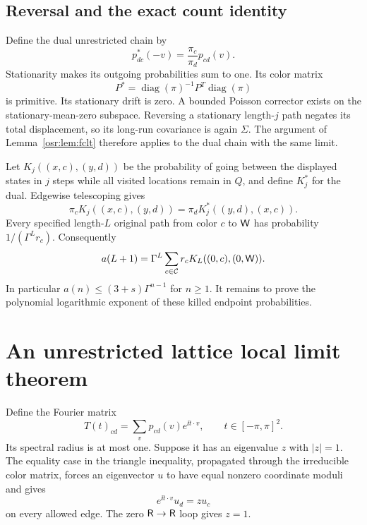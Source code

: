 \documentclass[11pt,letterpaper]{article}
\newcommand{\diag}{\operatorname{diag}}\newcommand{\rad}{\operatorname{rad}}
\newcommand{\G}{\Gamma}\newcommand{\s}{\sqrt{17}}
\numberwithin{equation}{section}
\begin{document}
\subsection{Reversal and the exact count identity}
Define the dual unrestricted chain by
\begin{equation}\label{osr:eq:dual}
 p^*_{dc}(-v)=\frac{\pi_c}{\pi_d}p_{cd}(v).
\end{equation}
Stationarity makes its outgoing probabilities sum to one. Its color matrix
\[P^*=\diag(\pi)^{-1}P^T\diag(\pi)\]
is primitive. Its stationary drift is zero. A bounded Poisson corrector exists on the stationary-mean-zero subspace. Reversing a stationary length-$j$ path negates its total displacement, so its long-run covariance is again $\Sigma$. The argument of Lemma~\ref{osr:lem:fclt} therefore applies to the dual chain with the same limit.

Let $K_j((x,c),(y,d))$ be the probability of going between the displayed states in $j$ steps while all visited locations remain in $Q$, and define $K_j^*$ for the dual. Edgewise telescoping gives
\begin{equation}\label{osr:eq:kdual}
 \pi_c K_j((x,c),(y,d))=\pi_d K_j^*((y,d),(x,c)).
\end{equation}
Every specified length-$L$ original path from color $c$ to $\mathsf W$ has probability $1/(\G^Lr_c)$. Consequently
\begin{equation}\label{osr:eq:countprob}
 a(L+1)=\G^L\sum_{c\in\mathcal C}r_c K_L((0,c),(0,\W)).
\end{equation}
In particular $a(n)\le(3+s)\G^{n-1}$ for $n\ge1$. It remains to prove the polynomial logarithmic exponent of these killed endpoint probabilities.

\section{An unrestricted lattice local limit theorem}\label{osr:sec:llt}
Define the Fourier matrix
\[
 T(t)_{cd}=\sum_v p_{cd}(v)e^{\ii t\cdot v},\qquad t\in[-\pi,\pi]^2.
\]
Its spectral radius is at most one. Suppose it has an eigenvalue $z$ with $|z|=1$. The equality case in the triangle inequality, propagated through the irreducible color matrix, forces an eigenvector $u$ to have equal nonzero coordinate moduli and gives
\begin{equation}\label{osr:eq:phase}
 e^{\ii t\cdot v}u_d=zu_c
\end{equation}
on every allowed edge. The zero $\mathsf R\to\mathsf R$ loop gives $z=1$.
\end{document}
